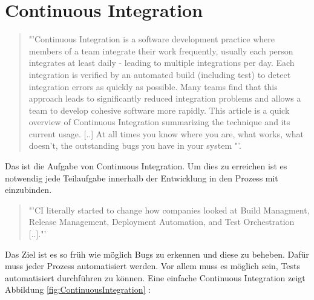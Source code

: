\section{Continuous Integration}
\label{sec:ContinuousIntegration}
\begin{quote}
	"'Continuous Integration is a software development practice where members of a team integrate their work frequently, usually each person integrates at least daily - leading to multiple integrations per day. Each integration is verified by an automated build (including test) to detect integration errors as quickly as possible. Many teams find that this approach leads to significantly reduced integration problems and allows a team to develop cohesive software more rapidly. This article is a quick overview of Continuous Integration summarizing the technique and its current usage. [..] At all times you know where you are, what works, what doesn't, the outstanding bugs you have in your system "'\cite{Fowler:CI}. 
\end{quote}
Das ist die Aufgabe von Continuous Integration. Um dies zu erreichen ist es notwendig jede Teilaufgabe innerhalb der Entwicklung in den Prozess mit einzubinden. 
\begin{quote}
	"'CI literally started to change how companies looked at Build Managment, Release Management, Deployment Automation, and Test Orchestration [..]."'\cite{IEEE:CDMitJenkins}
\end{quote}
Das Ziel ist es so früh wie möglich Bugs zu erkennen und diese zu beheben. Dafür muss jeder Prozess automatisiert werden. Vor allem muss es möglich sein, Tests automatisiert durchführen zu können. Eine einfache Continuous Integration zeigt Abbildung \ref{fig:ContinuousIntegration} :

